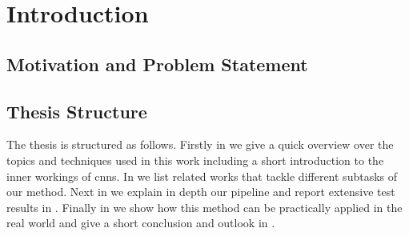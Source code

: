 %
\chapter{Introduction}
\label{sec:intro}

\section{Motivation and Problem Statement}
\label{sec:intro:motivation}

\section{Thesis Structure}
\label{sec:intro:structure}
The thesis is structured as follows. Firstly in \textbf{} we give a quick overview over the topics and techniques used in this work including a short introduction to the inner workings of \glspl{cnn}. In \textbf{} we list related works that tackle different subtasks of our method. Next in \textbf{} we explain in depth our pipeline and report extensive test results in \textbf{}. Finally in \textbf{} we show how this method can be practically applied in the real world and give a short conclusion and outlook in \textbf{}.
